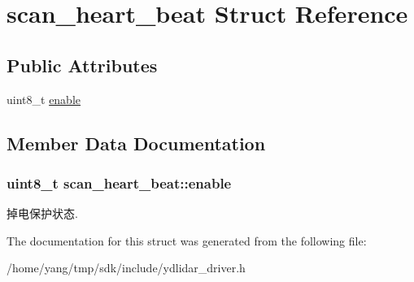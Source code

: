 \hypertarget{structscan__heart__beat}{}\section{scan\+\_\+heart\+\_\+beat Struct Reference}
\label{structscan__heart__beat}
\subsection*{Public Attributes}
\begin{DoxyCompactItemize}
\item 
uint8\+\_\+t \hyperlink{structscan__heart__beat_a2b75f0058448601c590dda44d962d5c9}{enable}
\end{DoxyCompactItemize}


\subsection{Member Data Documentation}
\subsubsection[{\texorpdfstring{enable}{enable}}]{\setlength{\rightskip}{0pt plus 5cm}uint8\+\_\+t scan\+\_\+heart\+\_\+beat\+::enable}\hypertarget{structscan__heart__beat_a2b75f0058448601c590dda44d962d5c9}{}\label{structscan__heart__beat_a2b75f0058448601c590dda44d962d5c9}
掉电保护状态. 

The documentation for this struct was generated from the following file\+:\begin{DoxyCompactItemize}
\item 
/home/yang/tmp/sdk/include/ydlidar\+\_\+driver.\+h\end{DoxyCompactItemize}
